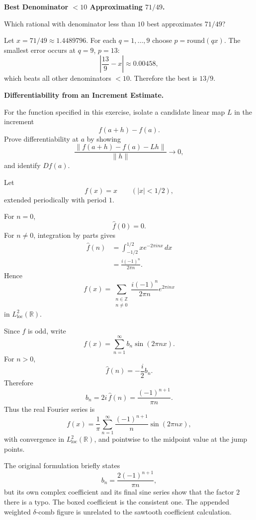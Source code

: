 \begin{problem}[CP-II-0425]
\label{prob:cp-ii-0425}
\textbf{Best Denominator $<10$ Approximating $71/49$.}

\hspace*{1.5em}Which rational with denominator less than $10$ best approximates $71/49$?
\end{problem}

\begin{solution}
Let $x=71/49\approx1.4489796$. For each $q=1,\dots,9$ choose $p=\mathrm{round}(qx)$.
The smallest error occurs at $q=9$, $p=13$:
\[
\left|\frac{13}{9}-x\right|\approx 0.00458,
\]
which beats all other denominators $<10$. Therefore the best is $\boxed{13/9}$.

\bigskip
\end{solution}

\begin{problem}[CP-II-0427]
\label{prob:cp-ii-0427}
\textbf{Differentiability from an Increment Estimate.}

\hspace*{1.5em}For the function specified in this exercise, isolate a candidate linear map
\(L\) in the increment
\[
f(a+h)-f(a).
\]
Prove differentiability at \(a\) by showing
\[
\frac{\|f(a+h)-f(a)-Lh\|}{\|h\|}\to0,
\]
and identify \(Df(a)\).
\end{problem}

\begin{solution}
Let
\[
f(x)=x
\qquad(|x|<1/2),
\]
extended periodically with period \(1\).

For \(n=0\),
\[
\widehat f(0)=0.
\]
For \(n\neq0\),
integration by parts gives
\[
\begin{aligned}
\widehat f(n)
&=
\int_{-1/2}^{1/2}
x e^{-2\pi inx}\,dx\\
&=
\frac{i(-1)^n}{2\pi n}.
\end{aligned}
\]
Hence
\[
\boxed{
f(x)
=
\sum_{\substack{n\in\mathbb Z\\n\neq0}}
\frac{i(-1)^n}{2\pi n}
e^{2\pi inx}
}
\]
in \(L^2_{\mathrm{loc}}(\mathbb R)\).

Since \(f\) is odd, write
\[
f(x)
=
\sum_{n=1}^{\infty}
b_n\sin(2\pi nx).
\]
For \(n>0\),
\[
\widehat f(n)=-\frac{i}{2}b_n.
\]
Therefore
\[
b_n
=
2i\,\widehat f(n)
=
\frac{(-1)^{n+1}}{\pi n}.
\]
Thus the real Fourier series is
\[
\boxed{
f(x)
=
\frac1\pi
\sum_{n=1}^{\infty}
\frac{(-1)^{n+1}}{n}
\sin(2\pi nx),
}
\]
with convergence in \(L^2_{\mathrm{loc}}(\mathbb R)\), and pointwise to the midpoint value at
the jump points.

The original formulation briefly states
\[
b_n=\frac{2(-1)^{n+1}}{\pi n},
\]
but its own complex coefficient and its final sine series show that the factor \(2\) there is
a typo. The boxed coefficient is the consistent one. The appended weighted
\(\delta\)-comb figure is unrelated to the sawtooth coefficient calculation.
\end{solution}


